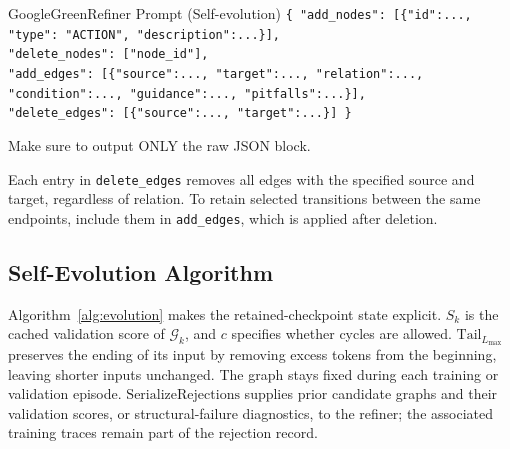 \begin{tracebox}{GoogleGreen}{Refiner Prompt (Self-evolution)}
\smallskip
\texttt{\{ "add\_nodes": \hspace{2pt}[\{"id":..., "type": "ACTION", "description":...\}],}\\
\texttt{\hspace*{9pt}"delete\_nodes": ["node\_id"],}\\
\texttt{\hspace*{9pt}"add\_edges": \hspace{2pt}[\{"source":..., "target":..., "relation":...,}\\
\texttt{\hspace*{86pt}"condition":..., "guidance":..., "pitfalls":...\}],}\\
\texttt{\hspace*{9pt}"delete\_edges": [\{"source":..., "target":...\}] \}}

\smallskip
Make sure to output ONLY the raw JSON block.
\end{tracebox}

\begin{samepage}
Each entry in \texttt{delete\_edges} removes all edges with the specified source and target, regardless of relation. To retain selected transitions between the same endpoints, include them in \texttt{add\_edges}, which is applied after deletion.
\end{samepage}

\subsection{Self-Evolution Algorithm}
\label{app:evolution_algorithm}

Algorithm~\ref{alg:evolution} makes the retained-checkpoint state explicit. $S_k$ is the cached validation score of $\mathcal{G}_k$, and $c$ specifies whether cycles are allowed. $\mathrm{Tail}_{L_{\max}}$ preserves the ending of its input by removing excess tokens from the beginning, leaving shorter inputs unchanged. The graph stays fixed during each training or validation episode. $\mathrm{SerializeRejections}$ supplies prior candidate graphs and their validation scores, or structural-failure diagnostics, to the refiner; the associated training traces remain part of the rejection record.

